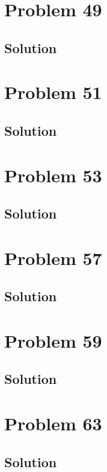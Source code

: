 \documentclass[12pt]{article}
\begin{document}
    \pagebreak
    \section{Problem 49}

    \subsection{Solution}

    \pagebreak
    \section{Problem 51}

    \subsection{Solution}

    \pagebreak
    \section{Problem 53}

    \subsection{Solution}

    \pagebreak
    \section{Problem 57}

    \subsection{Solution}

    \pagebreak
    \section{Problem 59}

    \subsection{Solution}

    \pagebreak
    \section{Problem 63}

    \subsection{Solution}
\end{document}
